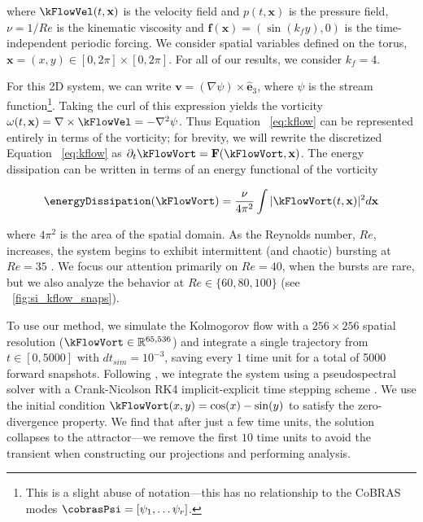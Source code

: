 \documentclass[twocolumn,10pt]{article}
\begin{document}
\noindent 
where $\kFlowVel(t, \mathbf x)$ is the velocity field and $p(t, \mathbf x)$ is the pressure field, $\nu = 1/Re$ is the kinematic viscosity and $\mathbf f(\mathbf x ) = (\sin(k_f y),0)$ is the time-independent periodic forcing. We consider spatial variables defined on the torus, $\mathbf x = (x,y) \in [0, 2\pi] \times [0, 2\pi]$. For all of our results, we consider $k_f = 4$. 

For this 2D system, we can write $\mathbf{v}= (\nabla \psi) \times \hat {\mathbf{e}}_3$, where $\psi$ is the stream function\footnote{
This is a slight abuse of notation---this has no relationship to the CoBRAS modes $\cobrasPsi = [\psi_1, \dots \psi_r]$.
}.
%
Taking the curl of this expression yields the vorticity $\omega(t, \mathbf x) = \nabla \times \kFlowVel = -\nabla^2 \psi$. 
Thus Equation ~\ref{eq:kflow} can be represented entirely in terms of the vorticity;
for brevity, we will rewrite the discretized Equation ~\ref{eq:kflow} as $\partial_t \kFlowVort = \mathbf F(\kFlowVort, \mathbf{x})$. 
The energy dissipation can be written in terms of an energy functional of the vorticity 

\begin{equation}
    \energyDissipation(\kFlowVort) = \frac{\nu}{4\pi^2} \int |\kFlowVort(t, \mathbf x)|^2 d \mathbf x
\end{equation}

\noindent where $4\pi^2$ is the area of the spatial domain. 
As the Reynolds number, $Re$, increases, the system begins to exhibit intermittent (and chaotic) bursting at $Re=35$ \cite{farazmand2017a}. We focus our attention primarily on $Re=40$, when the bursts are rare, but we also analyze the behavior at $Re \in \{60,80, 100\}$ (see \figurename ~\ref{fig:si_kflow_snaps}).

To use our method, we simulate the Kolmogorov flow with a $256 \times 256$ 
spatial resolution ($\kFlowVort \in \mathbb{R}^{65,536}$) and integrate a single trajectory from 
$t \in [0, 5000]$ with $dt_{sim} = 10^{-3}$, 
saving every $1$ time unit for a total of 5000 forward snapshots. Following \cite{kochkov2021machine}, we integrate the system using a pseudospectral solver with a Crank-Nicolson RK4 implicit-explicit time stepping scheme  \cite{sweby1984high}. We use the initial condition 
$\kFlowVort(x,y) = \cos(x) - \sin(y)$
to satisfy the zero-divergence property. We find that after just a few time units, the solution collapses to the attractor---we remove the first $10$ time units to avoid the transient when constructing our projections and performing analysis. 
\end{document}
